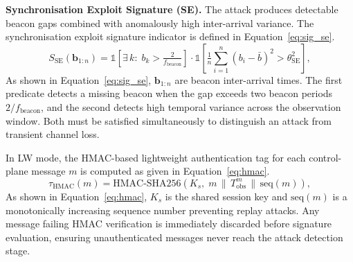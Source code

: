 \textbf{Synchronisation Exploit Signature (SE).}
The attack produces detectable beacon gaps combined with
anomalously high inter-arrival variance. The synchronisation
exploit signature indicator is defined in
Equation~\eqref{eq:sig_se}.
\begin{equation}
S_{\mathrm{SE}}(\mathbf{b}_{1:n}) =
  \mathbb{1}\!\left[\exists\,k:\;b_k > \tfrac{2}{f_{\mathrm{beacon}}}
  \right]
  \cdot
  \mathbb{1}\!\left[\tfrac{1}{n}
    \sum_{i=1}^{n}(b_i-\bar{b})^2 > \theta_{\mathrm{SE}}^2\right],
\label{eq:sig_se}
\end{equation}
As shown in Equation~\eqref{eq:sig_se}, $\mathbf{b}_{1:n}$
are beacon inter-arrival times. The first predicate detects a
missing beacon when the gap exceeds two beacon periods
$2/f_{\mathrm{beacon}}$, and the second detects high temporal
variance across the observation window. Both must be satisfied
simultaneously to distinguish an attack from transient channel
loss.

In LW mode, the HMAC-based lightweight authentication tag for
each control-plane message $m$ is computed as given in
Equation~\eqref{eq:hmac}.
\begin{equation}
\tau_{\mathrm{HMAC}}(m) =
  \mathrm{HMAC\text{-}SHA256}\!\left(K_s,\;
  m \,\|\, T_{\mathrm{obs}}^{m} \,\|\, \mathrm{seq}(m)\right),
\label{eq:hmac}
\end{equation}
As shown in Equation~\eqref{eq:hmac}, $K_s$ is the shared
session key and $\mathrm{seq}(m)$ is a monotonically increasing
sequence number preventing replay attacks. Any message failing
HMAC verification is immediately discarded before signature
evaluation, ensuring unauthenticated messages never reach the
attack detection stage.


